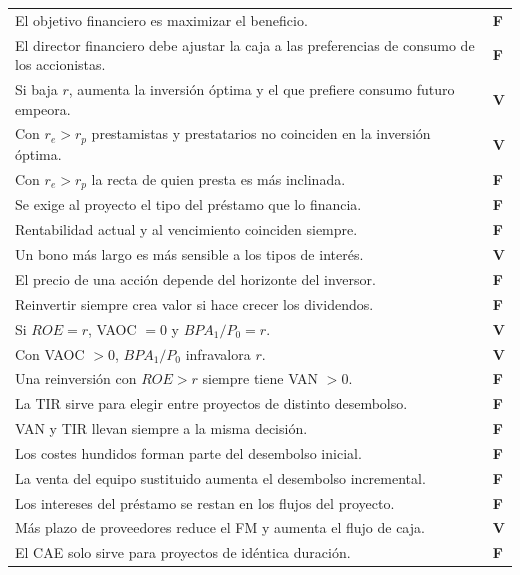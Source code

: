 \documentclass[10pt,a4paper,twoside]{article}
\renewcommand{\arraystretch}{1.18}
\begin{document}
\begin{tcolorbox}[base,colback=alertbg,colframe=alert,borderline west={3pt}{0pt}{alert},
   title={\faExclamationTriangle\ \ Veinte afirmaciones de test (V/F)},colbacktitle=alert]
\small
\renewcommand{\arraystretch}{1.12}
\begin{tabularx}{\linewidth}{@{}L >{\leavevmode\sffamily\bfseries\centering\arraybackslash}p{0.7cm}@{}}
El objetivo financiero es maximizar el beneficio. & \color{alert}F\\
El director financiero debe ajustar la caja a las preferencias de consumo de los accionistas. & \color{alert}F\\
Si baja $r$, aumenta la inversión óptima y el que prefiere consumo futuro empeora. & \color{okgreen}V\\
Con $r_e>r_p$ prestamistas y prestatarios no coinciden en la inversión óptima. & \color{okgreen}V\\
Con $r_e>r_p$ la recta de quien presta es más inclinada. & \color{alert}F\\
Se exige al proyecto el tipo del préstamo que lo financia. & \color{alert}F\\
Rentabilidad actual y al vencimiento coinciden siempre. & \color{alert}F\\
Un bono más largo es más sensible a los tipos de interés. & \color{okgreen}V\\
El precio de una acción depende del horizonte del inversor. & \color{alert}F\\
Reinvertir siempre crea valor si hace crecer los dividendos. & \color{alert}F\\
Si $ROE=r$, VAOC $=0$ y $BPA_1/P_0=r$. & \color{okgreen}V\\
Con VAOC $>0$, $BPA_1/P_0$ infravalora $r$. & \color{okgreen}V\\
Una reinversión con $ROE>r$ siempre tiene VAN $>0$. & \color{alert}F\\
La TIR sirve para elegir entre proyectos de distinto desembolso. & \color{alert}F\\
VAN y TIR llevan siempre a la misma decisión. & \color{alert}F\\
Los costes hundidos forman parte del desembolso inicial. & \color{alert}F\\
La venta del equipo sustituido aumenta el desembolso incremental. & \color{alert}F\\
Los intereses del préstamo se restan en los flujos del proyecto. & \color{alert}F\\
Más plazo de proveedores reduce el FM y aumenta el flujo de caja. & \color{okgreen}V\\
El CAE solo sirve para proyectos de idéntica duración. & \color{alert}F\\
\end{tabularx}
\end{tcolorbox}
\end{document}
